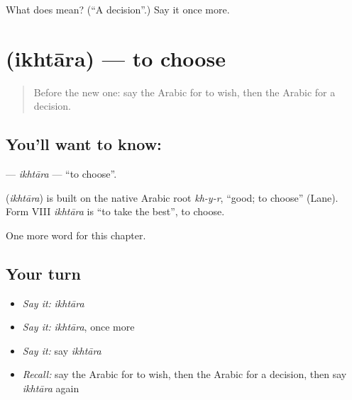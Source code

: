 \begin{tcolorbox}[breakable,colback=teal!4,colframe=teal!35!black,title={Before you move on}]
What does  mean? (\textquotedblleft{}A decision\textquotedblright{}.) Say it once more.
\end{tcolorbox}
\section[\texorpdfstring{\ar{اختار} (ikhtāra)}{اختار (ikhtāra)}]{ (ikhtāra) — to choose}

\label{lesson:AR-C115-ikhtara}



\begin{quote}
Before the new one: say the Arabic for to wish, then the Arabic for a decision.
\end{quote}

\subsection*{You'll want to know: }
\textbf{} — \emph{ikhtāra} — \textquotedblleft{}to choose\textquotedblright{}.

\begin{cousinweb}
\textbf{} (\emph{ikhtāra}) is built on the native Arabic root \emph{kh-y-r}, \textquotedblleft{}good; to choose\textquotedblright{} (Lane). Form VIII \emph{ikhtāra} is \textquotedblleft{}to take the best\textquotedblright{}, to choose.
\end{cousinweb}

\begin{grammarlens}[title={What you've built}]
One more word for this chapter.
\end{grammarlens}

\subsection*{Your turn}
\begin{itemize}
\raggedright
  \item \emph{Say it:} \emph{ikhtāra}
  \item \emph{Say it:} \emph{ikhtāra}, once more
  \item \emph{Say it:} say \emph{ikhtāra}
  \item \emph{Recall:} say the Arabic for to wish, then the Arabic for a decision, then say \emph{ikhtāra} again
\end{itemize}

